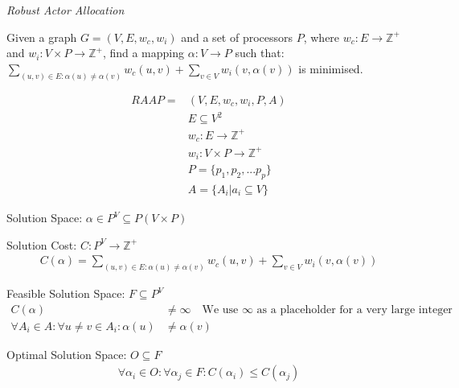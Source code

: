 \documentclass{article}
\begin{document}
\begin{definition}
{\em Robust Actor Allocation}

Given a graph $G=(V,E,w_c,w_i)$ and a set of processors $P$, where $w_c : E \rightarrow \mathbb{Z}^+$ and $w_i : V \times P \rightarrow \mathbb{Z}^+$, find a mapping $\alpha : V \rightarrow P$ such that:
$\displaystyle\sum\limits_{(u,v) \in E : \alpha(u) \neq \alpha(v)} w_c(u,v) + \displaystyle\sum\limits_{v \in V} w_i(v, \alpha(v))$ is minimised.

\begin{align}
	\nonumber RAAP = & (V,E,w_c, w_i, P, A)\\
	\nonumber & E \subseteq V^2\\
	\nonumber & w_c : E \rightarrow \mathbb{Z}^+\\
	\nonumber & w_i : V \times P \rightarrow \mathbb{Z}^+\\
	\nonumber & P = \{p_1, p_2, ...p_p\} \\
	\nonumber & A = \{A_i | a_i \subseteq V\}
\end{align}

Solution Space: $\alpha \in P^V \subseteq P(V \times P)$

Solution Cost: $C : P^V \rightarrow \mathbb{Z}^+$
\begin{align}
	\nonumber C(\alpha) = \displaystyle\sum\limits_{(u,v) \in E : \alpha(u) \neq \alpha(v)} w_c(u,v) + \displaystyle\sum\limits_{v \in V} w_i(v, \alpha(v))
\end{align}

Feasible Solution Space: $F \subseteq P^V$
\begin{align}
	\nonumber C(\alpha) & \neq \infty \quad \mbox{We use $\infty$ as a placeholder for a very large integer} \\
	\nonumber \forall A_i \in A : \forall u \neq v \in A_i : \alpha(u) & \neq  \alpha(v)
\end{align}

Optimal Solution Space: $O \subseteq F$
\begin{align}
	\nonumber 	\forall \alpha_i \in O : \forall \alpha_j \in F : C(\alpha_i) \leq C(\alpha_j)
\end{align}

\end{definition}
\end{document}

